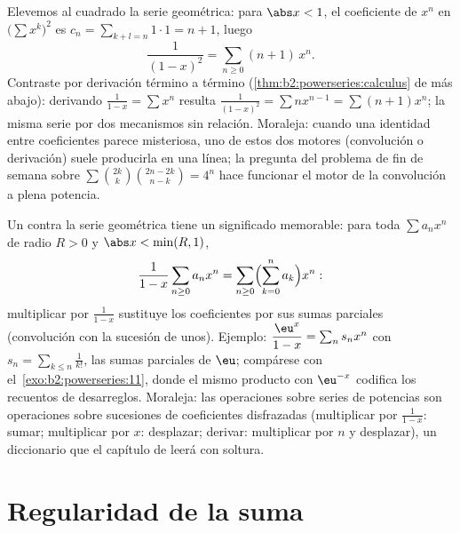 \begin{example}\label{ex:b2:powerseries:cauchysquare}
Elevemos al cuadrado la serie geométrica: para $\abs x < 1$, el
coeficiente de $x^n$ en $\bigl(\sum x^k\bigr)^2$ es $c_n =
\sum_{k+l=n} 1\cdot1 = n + 1$, luego
\[
\frac{1}{(1-x)^2} = \sum_{n\geq0}(n+1)\,x^n .
\]
Contraste por derivación término a término
(\cref{thm:b2:powerseries:calculus} de más abajo): derivando
$\frac{1}{1-x} = \sum x^n$ resulta $\frac{1}{(1-x)^2} = \sum
nx^{n-1} = \sum(n+1)x^n$; la misma serie por dos mecanismos sin
relación. Moraleja: cuando una identidad entre coeficientes parece
misteriosa, uno de estos dos motores (convolución o derivación)
suele producirla en una línea; la pregunta del problema de fin de
semana sobre $\sum\binom{2k}k\binom{2n-2k}{n-k} = 4^n$ hace
funcionar el motor de la convolución a plena potencia.
\end{example}

\begin{example}\label{ex:b2:powerseries:partialsums}
Un  contra la serie geométrica tiene un
significado memorable: para toda $\sum a_nx^n$ de radio $R > 0$ y
$\abs x < \min(R, 1)$,
\[
\frac{1}{1-x}\sum_{n\geq0}a_nx^n
= \sum_{n\geq0}\Bigl(\sum_{k=0}^{n}a_k\Bigr)x^n :
\]
multiplicar por $\frac{1}{1-x}$ sustituye los coeficientes por sus
sumas parciales (convolución con la sucesión de unos). Ejemplo:
$\dfrac{\eu^x}{1-x} = \sum_n s_n x^n$ con $s_n = \sum_{k\leq
n}\frac{1}{k!}$, las sumas parciales de $\eu$; compárese con el~\cref{exo:b2:powerseries:11}, donde el mismo producto con $\eu^{-x}$
codifica los recuentos de desarreglos. Moraleja: las operaciones
sobre series de potencias son operaciones sobre sucesiones de
coeficientes disfrazadas (multiplicar por $\frac1{1-x}$: sumar;
multiplicar por $x$: desplazar; derivar: multiplicar por $n$ y
desplazar), un diccionario que el capítulo de 
leerá con soltura.
\end{example}

\section{Regularidad de la suma}

